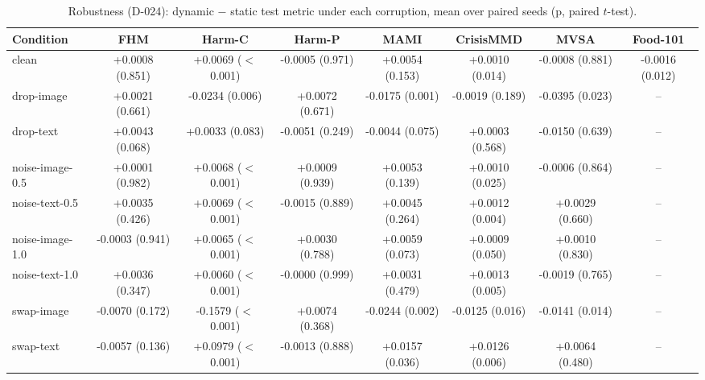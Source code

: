 \begin{table}[t]
\centering
\caption{Robustness (D-024): dynamic $-$ static test metric under each corruption, mean over paired seeds (p, paired $t$-test).}
\label{tab:robustness}
\begin{tabular}{lccccccc}
\toprule
Condition & FHM & Harm-C & Harm-P & MAMI & CrisisMMD & MVSA & Food-101 \\
\midrule
clean & +0.0008 (0.851) & +0.0069 ($<$0.001) & -0.0005 (0.971) & +0.0054 (0.153) & +0.0010 (0.014) & -0.0008 (0.881) & -0.0016 (0.012) \\
drop-image & +0.0021 (0.661) & -0.0234 (0.006) & +0.0072 (0.671) & -0.0175 (0.001) & -0.0019 (0.189) & -0.0395 (0.023) & – \\
drop-text & +0.0043 (0.068) & +0.0033 (0.083) & -0.0051 (0.249) & -0.0044 (0.075) & +0.0003 (0.568) & -0.0150 (0.639) & – \\
noise-image-0.5 & +0.0001 (0.982) & +0.0068 ($<$0.001) & +0.0009 (0.939) & +0.0053 (0.139) & +0.0010 (0.025) & -0.0006 (0.864) & – \\
noise-text-0.5 & +0.0035 (0.426) & +0.0069 ($<$0.001) & -0.0015 (0.889) & +0.0045 (0.264) & +0.0012 (0.004) & +0.0029 (0.660) & – \\
noise-image-1.0 & -0.0003 (0.941) & +0.0065 ($<$0.001) & +0.0030 (0.788) & +0.0059 (0.073) & +0.0009 (0.050) & +0.0010 (0.830) & – \\
noise-text-1.0 & +0.0036 (0.347) & +0.0060 ($<$0.001) & -0.0000 (0.999) & +0.0031 (0.479) & +0.0013 (0.005) & -0.0019 (0.765) & – \\
swap-image & -0.0070 (0.172) & -0.1579 ($<$0.001) & +0.0074 (0.368) & -0.0244 (0.002) & -0.0125 (0.016) & -0.0141 (0.014) & – \\
swap-text & -0.0057 (0.136) & +0.0979 ($<$0.001) & -0.0013 (0.888) & +0.0157 (0.036) & +0.0126 (0.006) & +0.0064 (0.480) & – \\
\bottomrule
\end{tabular}
\end{table}
